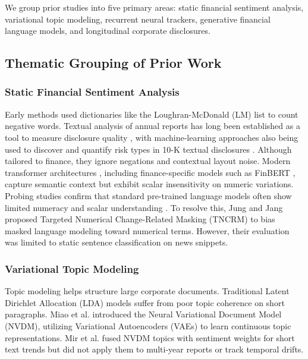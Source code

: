 \documentclass[pdflatex,sn-basic,Numbered]{sn-jnl}
\begin{document}
We group prior studies into five primary areas: static financial sentiment analysis, variational topic modeling, recurrent neural trackers, generative financial language models, and longitudinal corporate disclosures.

\subsection{Thematic Grouping of Prior Work}
\subsubsection{Static Financial Sentiment Analysis}
Early methods used dictionaries like the Loughran-McDonald (LM) list \cite{loughran2011} to count negative words. Textual analysis of annual reports has long been established as a tool to measure disclosure quality \cite{li2010}, with machine-learning approaches also being used to discover and quantify risk types in 10-K textual disclosures \cite{bao2014}. Although tailored to finance, they ignore negations and contextual layout noise. Modern transformer architectures \cite{vaswani2017}, including finance-specific models such as FinBERT \cite{araci2019}, capture semantic context but exhibit scalar insensitivity on numeric variations. Probing studies confirm that standard pre-trained language models often show limited numeracy and scalar understanding \cite{wallace2019, thawani2021}. To resolve this, Jung and Jang \cite{jung2024} proposed Targeted Numerical Change-Related Masking (TNCRM) to bias masked language modeling toward numerical terms. However, their evaluation was limited to static sentence classification on news snippets.

\subsubsection{Variational Topic Modeling}
Topic modeling helps structure large corporate documents. Traditional Latent Dirichlet Allocation (LDA) models \cite{blei2003} suffer from poor topic coherence on short paragraphs. Miao et al. \cite{miao2016} introduced the Neural Variational Document Model (NVDM), utilizing Variational Autoencoders (VAEs) \cite{kingma2013} to learn continuous topic representations. Mir et al. \cite{mir2025} fused NVDM topics with sentiment weights for short text trends but did not apply them to multi-year reports or track temporal drifts.
\end{document}
